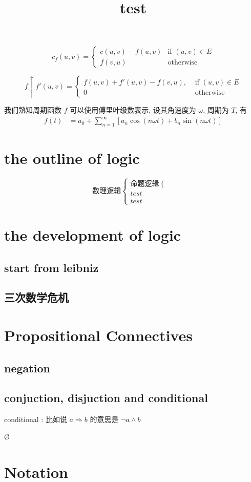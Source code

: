 \documentclass[a4paper, 10pt]{ctexart} %
\title{test}
\begin{document}
\tableofcontents
\maketitle

$$ c_f \left(u ,v \right) = \begin{cases} c (u,v)  -f (u,v) & \text{if } \left(u ,v\right) \in E \\ f \left( v, u\right) & \text{otherwise} \end{cases} $$

$$ f\uparrow f' \left( u ,v\right)= \begin{cases} f( u , v) + f' \left(u ,v\right) - f\left( v , u\right), &\text{ if } \left(u ,v\right) \in E \\ 0 & \text{ otherwise} \end{cases} $$

我们熟知周期函数 $f$ 可以使用傅里叶级数表示, 设其角速度为 $\omega$, 周期为 $T$, 有
$$ \begin{aligned} f \left(t\right) & = a_0 + \sum_{n=1} ^{\infty} \left[ a_{n} \cos  \left(n\omega t\right) + b_{n} \sin  \left(n \omega t\right)\right] \end{aligned} $$
\section{the outline of logic}
\[
    \text{数理逻辑}
    \begin{cases}
        \text{命题逻辑}
        \begin{cases}
            \text{}\\
            \text{}
        \end{cases}\\
        test\\
        test
    \end{cases}
\]
\section{the development of logic}
\subsection{start from leibniz}
\subsection{三次数学危机}
\section{Propositional Connectives}
\subsection{negation}
\subsection{conjuction, disjuction and conditional}

conditional : 比如说 $a\Rightarrow b$ 的意思是 $\neg a \land b$

\O
\section{Notation}
\end{document}
